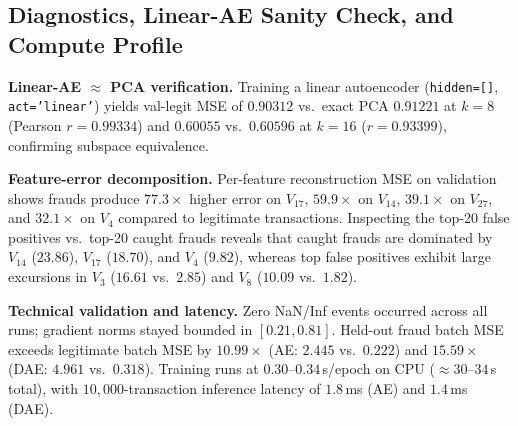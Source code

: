 \subsection{Diagnostics, Linear-AE Sanity Check, and Compute Profile}
\label{sec:ae_diagnostics}

\textbf{Linear-AE $\approx$ PCA verification.}
Training a linear autoencoder (\texttt{hidden=[]}, \texttt{act='linear'}) yields
val-legit MSE of $0.90312$ vs.\ exact PCA $0.91221$ at $k=8$ (Pearson
$r = 0.99334$) and $0.60055$ vs.\ $0.60596$ at $k=16$ ($r = 0.93399$),
confirming subspace equivalence.

\textbf{Feature-error decomposition.}
Per-feature reconstruction MSE on validation shows frauds produce $77.3\times$
higher error on $V_{17}$, $59.9\times$ on $V_{14}$, $39.1\times$ on $V_{27}$,
and $32.1\times$ on $V_{4}$ compared to legitimate transactions.  Inspecting the
top-20 false positives vs.\ top-20 caught frauds reveals that caught frauds are
dominated by $V_{14}$ ($23.86$), $V_{17}$ ($18.70$), and $V_{4}$ ($9.82$),
whereas top false positives exhibit large excursions in $V_3$ ($16.61$ vs.\
$2.85$) and $V_8$ ($10.09$ vs.\ $1.82$).

\textbf{Technical validation and latency.}
Zero NaN/Inf events occurred across all runs; gradient norms stayed bounded in
$[0.21, 0.81]$.  Held-out fraud batch MSE exceeds legitimate batch MSE by
$10.99\times$ (AE: $2.445$ vs.\ $0.222$) and $15.59\times$ (DAE: $4.961$ vs.\
$0.318$).  Training runs at $0.30$--$0.34$\,s/epoch on CPU ($\approx 30$--$34$\,s
total), with $10{,}000$-transaction inference latency of $1.8$\,ms (AE) and
$1.4$\,ms (DAE).

